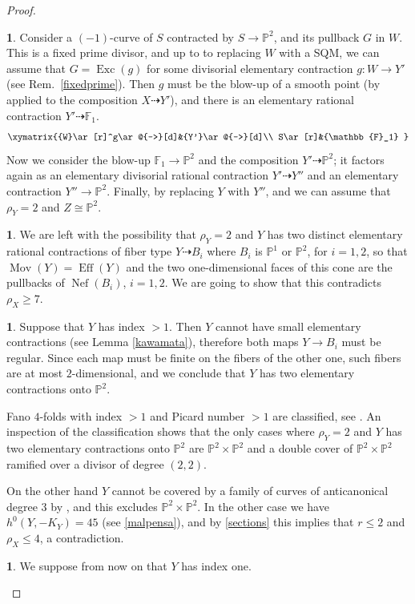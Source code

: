 \documentclass[a4paper,12pt]{amsart}
\theoremstyle{definition}
\newtheorem{prg}[thm]{}
\numberwithin{figure}{section}
\numberwithin{table}{section}
\newcommand{\pr}{\mathbb{P}}
\newcommand{\Exc}{\operatorname{Exc}}
\newcommand{\Eff}{\operatorname{Eff}}
\newcommand{\Nef}{\operatorname{Nef}}
\newcommand{\Mov}{\operatorname{Mov}}
\begin{document}
\begin{proof}
\begin{prg}
    Consider a $(-1)$-curve of $S$ contracted by $S \to \pr^2$, and its pullback $G$ in $W$. This is a fixed
prime divisor, and up to to replacing  $W$ with a SQM, we can assume that $G = \Exc(g)$ for some
divisorial elementary contraction $g \colon W \to Y'$ (see Rem.~\ref{fixedprime}). Then $g$ must be the blow-up of a smooth point (by \cite[Lemma 4.19(2)]{blowup} applied to the composition $X\dasharrow Y'$), and there is an elementary rational contraction $Y'\dasharrow \mathbb{F}_1$.
$$\xymatrix{{W}\ar[r]^g\ar@{-->}[d]&{Y'}\ar@{-->}[d]\\
S\ar[r]&{\mathbb{F}_1}
}$$
Now we consider the blow-up $\mathbb{F}_1\to\pr^2$ and the composition $Y'\dasharrow \pr^2$; it factors again as an elementary divisorial rational contraction $Y'\dasharrow Y''$ and an elementary contraction $Y''\to\pr^2$. Finally, by replacing $Y$ with $Y''$,
 and we can assume that $\rho_Y=2$ and $Z\cong\pr^2$.
\end{prg}
  \begin{prg}
    We are left with the possibility that $\rho_Y=2$ and $Y$ has two distinct elementary rational contractions of fiber type $Y\dasharrow B_i$  where $B_i$ is $\pr^1$ or $\pr^2$, for $i=1,2$, so that $\Mov(Y)=\Eff(Y)$ and the two one-dimensional faces of this cone are the pullbacks of $\Nef(B_i)$, $i=1,2$.
    We are going to show that
   this contradicts $\rho_X\geq 7$.
   \end{prg}
 \begin{prg}\label{flixbus}
Suppose that $Y$ has index $>1$. Then $Y$ cannot have small elementary contractions (see Lemma \ref{kawamata}), therefore 
both maps $Y\to B_i$ must be regular. Since each map must be finite on the fibers of the other one, such fibers are at most $2$-dimensional, and we conclude that $Y$ has two elementary contractions onto $\pr^2$.

Fano $4$-folds with index $>1$ and Picard number $>1$ are classified, see \cite[Cor.~3.1.15, Th.~3.3.1, Th.~7.2.15]{fanoEMS}. An inspection of the classification shows that the only cases where $\rho_Y=2$ and $Y$ has  two elementary contractions onto $\pr^2$ are $\pr^2\times\pr^2$ and 
a double cover of $\pr^2\times\pr^2$ ramified over a divisor of degree $(2,2)$.

On the other hand $Y$ cannot be covered by a family of curves of anticanonical degree $3$ by \cite[Lemma 3.12]{blowup}, and this excludes $\pr^2\times\pr^2$. In the other case
we have $h^0(Y,-K_Y)=45$ (see \ref{malpensa}), and by \eqref{sections} this implies that $r\leq 2$ and $\rho_X\leq 4$, a contradiction.
\end{prg}
  \begin{prg}\label{duo}
We suppose from now on that $Y$ has index one.


\end{prg}
\end{proof}
\end{document}
